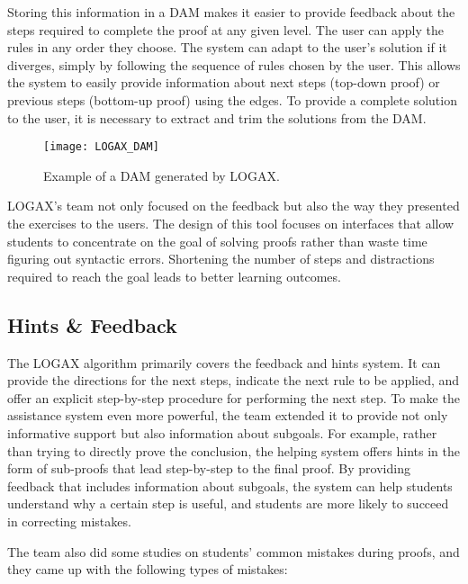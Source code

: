 Storing this information in a \gls{DAM} makes it easier to provide feedback about the steps required to complete the proof at any given level. The user can apply the rules in any order they choose. The system can adapt to the user's solution if it diverges, simply by following the sequence of rules chosen by the user. This allows the system to easily provide information about next steps (top-down proof) or previous steps (bottom-up proof) using the edges. To provide a complete solution to the user, it is necessary to extract and trim the solutions from the \gls{DAM}.

\begin{figure}[htbp]
    \centering
    \texttt{[image: LOGAX\_DAM]}
    \caption{Example of a \gls{DAM} generated by LOGAX.}
    \label{img:dam}
\end{figure}

LOGAX's team not only focused on the feedback but also the way they presented the exercises to the users. The design of this tool focuses on interfaces that allow students to concentrate on the goal of solving proofs rather than waste time figuring out syntactic errors. Shortening the number of steps and distractions required to reach the goal leads to better learning outcomes.

\subsection{Hints \& Feedback}

The LOGAX algorithm primarily covers the feedback and hints system. It can provide the directions for the next steps, indicate the next rule to be applied, and offer an explicit step-by-step procedure for performing the next step. To make the assistance system even more powerful, the team extended it to provide not only informative support but also information about subgoals. For example, rather than trying to directly prove the conclusion, the helping system offers hints in the form of sub-proofs that lead step-by-step to the final proof. By providing feedback that includes information about subgoals, the system can help students understand why a certain step is useful, and students are more likely to succeed in correcting mistakes.

The team also did some studies on students' common mistakes during proofs, and they came up with the following types of mistakes:

